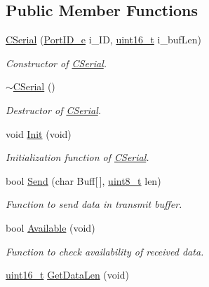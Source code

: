 \subsection*{Public Member Functions}
\begin{DoxyCompactItemize}
\item 
\mbox{\hyperlink{class_c_serial_a3b2b31de1529b884b8d5e354586ee981}{C\+Serial}} (\mbox{\hyperlink{class_c_serial_a000039540cc90b18bafacf5744e7eda2}{Port\+I\+D\+\_\+e}} i\+\_\+\+ID, \mbox{\hyperlink{_a_d_a_s___types_8h_a1f1825b69244eb3ad2c7165ddc99c956}{uint16\+\_\+t}} i\+\_\+buf\+Len)
\begin{DoxyCompactList}\small\item\em Constructor of \mbox{\hyperlink{class_c_serial}{C\+Serial}}. \end{DoxyCompactList}\item 
\mbox{\hyperlink{class_c_serial_aff5444dd7e6a9ddc43cbce0e959edf7a}{$\sim$\+C\+Serial}} ()
\begin{DoxyCompactList}\small\item\em Destructor of \mbox{\hyperlink{class_c_serial}{C\+Serial}}. \end{DoxyCompactList}\item 
void \mbox{\hyperlink{class_c_serial_aed500bd204c4b37665d6d228333edafb}{Init}} (void)
\begin{DoxyCompactList}\small\item\em Initialization function of \mbox{\hyperlink{class_c_serial}{C\+Serial}}. \end{DoxyCompactList}\item 
bool \mbox{\hyperlink{class_c_serial_ae5bec6d6a1c75839ae02cf0069d1f08e}{Send}} (char Buff\mbox{[}$\,$\mbox{]}, \mbox{\hyperlink{_a_d_a_s___types_8h_aba7bc1797add20fe3efdf37ced1182c5}{uint8\+\_\+t}} len)
\begin{DoxyCompactList}\small\item\em Function to send data in transmit buffer. \end{DoxyCompactList}\item 
bool \mbox{\hyperlink{class_c_serial_abb43734223d937a86e7616636ea16024}{Available}} (void)
\begin{DoxyCompactList}\small\item\em Function to check availability of received data. \end{DoxyCompactList}\item 
\mbox{\hyperlink{_a_d_a_s___types_8h_a1f1825b69244eb3ad2c7165ddc99c956}{uint16\+\_\+t}} \mbox{\hyperlink{class_c_serial_a4327d6041fe9a390612b214709027cbb}{Get\+Data\+Len}} (void)

\end{DoxyCompactItemize}
